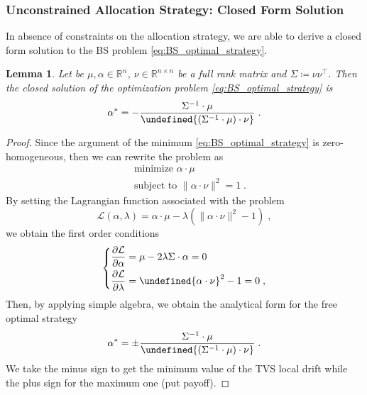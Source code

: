 \documentclass[11pt]{article}
\newtheorem{lemma}[theorem]{Lemma}
\newcommand{\tr}[1]{{#1}^{\intercal}} %
\let\norm\undefined %
\DeclarePairedDelimiter\norm{\lVert}{\rVert}
\newenvironment{eqsys}{\begin{equation}\begin{dcases}}{\end{dcases}\end{equation}}
\begin{document}
\subsubsection{Unconstrained Allocation Strategy: Closed Form Solution}
In absence of constraints on the allocation strategy, we are able to derive a closed form solution to the BS problem \eqref{eq:BS_optimal_strategy}.
\begin{lemma}
	Let be $\mu, \alpha \in \mathbb{R}^n$, $\nu \in \mathbb{R}^{n\times n}$ be a full rank matrix and $\Sigma\coloneqq \nu \tr{\nu}$. Then the closed solution of the optimization problem \eqref{eq:BS_optimal_strategy} is 
	\begin{equation}
			\alpha^* = - \frac{\Sigma^{-1} \cdot \mu}{\norm{(\Sigma^{-1} \cdot \mu)\cdot \nu}} \; .
	\end{equation}
\end{lemma}
\begin{proof}
Since the argument of the minimum \eqref{eq:BS_optimal_strategy} is zero-homogeneous, then we can rewrite the problem as
\begin{equation}
		\begin{aligned}
			&\text { minimize } \alpha \cdot \mu\\
			&\text { subject to } \|\alpha \cdot \nu\|^2=1 \; .
	\end{aligned}
\end{equation}
By setting the Lagrangian function associated with the problem
\begin{equation}
	\mathcal{L}\left(\alpha, \lambda\right)=\alpha \cdot \mu-\lambda\left(\|\alpha \cdot \nu\|^2-1\right) \; ,
\end{equation}
we obtain the first order conditions
\begin{eqsys}
	\frac{\partial \mathcal{L}}{\partial \alpha}=\mu -2\lambda \Sigma \cdot \alpha=0 \\
	\frac{\partial \mathcal{L}}{\partial \lambda}= \norm{\alpha \cdot \nu}^2-1=0
	\; ,
\end{eqsys}
Then, by applying simple algebra, we obtain the analytical form for the free optimal strategy
\begin{equation}
	\alpha^* = \pm \frac{\Sigma^{-1} \cdot \mu}{\norm{(\Sigma^{-1} \cdot \mu)\cdot \nu}} \; .
\label{eq:analytical_solution_free_strategy}\end{equation}
We take the minus sign to get the minimum value of the TVS local drift while the plus sign for the maximum one (put payoff).
\end{proof}
\end{document}
